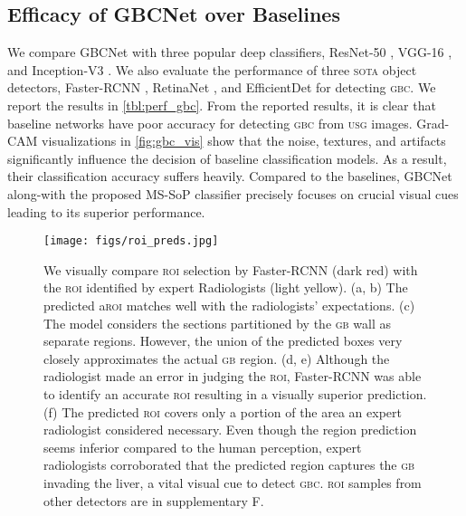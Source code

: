 \documentclass[10pt,twocolumn,letterpaper]{article}
\def\sota{\textsc{sota}\xspace}
\def\usg{\textsc{usg}\xspace}
\def\gbc{\textsc{gbc}\xspace}
\def\gb{\textsc{gb}\xspace}
\def\roi{\textsc{roi}\xspace}
\begin{document}
\subsection{Efficacy of GBCNet over Baselines}
We compare GBCNet with three popular deep classifiers, ResNet-50 \cite{resnet}, VGG-16 \cite{vgg}, and Inception-V3 \cite{inception}. We also evaluate the performance of three \sota object detectors, Faster-RCNN \cite{fasterrcnn}, RetinaNet \cite{retinanet}, and EfficientDet \cite{efficientdet} for detecting \gbc. We report the results in \cref{tbl:perf_gbc}. From the reported results, it is clear that baseline networks have poor accuracy for detecting \gbc from \usg images. Grad-CAM \cite{gradcam} visualizations in \cref{fig:gbc_vis} show that the noise, textures, and artifacts significantly influence the decision of baseline classification models. As a result, their classification accuracy suffers heavily. Compared to the baselines, GBCNet along-with the proposed MS-SoP classifier precisely focuses on crucial visual cues leading to its superior performance.

\begin{table}[t]
	\centering
	\scriptsize
{}
	\caption{Comparison of the \gb region selection models. We reported 10-fold cross validation (MeanSD) of the metrics.}
\label{tbl:perf_region}
\end{table}
\begin{figure}[t]
	\centering
	\texttt{[image: figs/roi\_preds.jpg]}
	\caption{We visually compare \roi selection by Faster-RCNN (dark red) with the \roi identified by expert Radiologists (light yellow). (a, b) The predicted a\roi matches well with the radiologists' expectations. (c) The model considers the sections partitioned by the \gb wall as separate regions. However, the union of the predicted boxes very closely approximates the actual \gb region. (d, e) Although the radiologist made an error in judging the \roi, Faster-RCNN was able to identify an accurate \roi resulting in a visually superior prediction. (f) The predicted \roi covers only a portion of the area an expert radiologist considered necessary. Even though the region prediction seems inferior compared to the human perception, expert radiologists corroborated that the predicted region captures the \gb invading the liver, a vital visual cue to detect \gbc. \roi samples from other detectors are in supplementary F.}
\label{fig:region_vis}
\end{figure}
\end{document}
